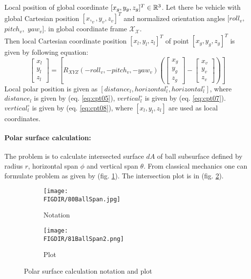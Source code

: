 \begin{definition}{Local position of global coordinate $[x_g,y_g,z_g]^T\in\mathbb{R}^3$.}\label{def:globalToLocal}
    Let there be vehicle with global Cartesian position $[x,_v,y_v,z_v]^T$ and normalized orientation angles $[roll_v,$ $pitch_v,$ $yaw_v]$. in global coordinate frame $\mathscr{X}_\mathscr{X}$.\\
    Then local Cartesian coordinate position $[x_l,y_l,z_l]^T$ of point $[x_g,y_g,z_g]^T$ is given by following equation:
    \begin{equation}
        \begin{bmatrix}
            x_l\\y_l\\z_l
        \end{bmatrix}
        =
        \left [
            R_{XYZ}(-roll_v,-pitch_v,-yaw_v)
            \left (
            \begin{bmatrix}
                x_g\\y_g\\z_g
            \end{bmatrix}
            -
            \begin{bmatrix}
                x_v\\y_v\\z_v
            \end{bmatrix}
            \right )
        \right ]
    \end{equation}
    Local polar position is given as $[distance_l, horizontal_l^\circ,horizontal_l^\circ]$, where $distance_l$ is given by (eq. \ref{eq:cpt05}), $vertical_l^\circ$ is given by (eq. \ref{eq:cpt07}). $vertical_l^\circ$ is given by (eq. \ref{eq:cpt08}), where $[x_l,y_l,z_l]$ are used as local coordinates.
\end{definition}

\paragraph{Polar surface calculation:} The problem is to calculate intersected surface $dA$ of ball subsurface defined by radius $r$, horizontal span $\phi$ and vertical span $\theta$. From classical mechanics one can formulate problem as given by (fig. \ref{fig:80BallSpan}). The intersection plot is in (fig. \ref{fig:81BallSpan2}).

\begin{figure}[H]
    \centering
    \begin{subfigure}[H]{0.3\textwidth}
        \texttt{[image: \\FIGDIR/80BallSpan.jpg]}
        \caption{Notation}
        \label{fig:80BallSpan}
    \end{subfigure}
    \begin{subfigure}[H]{0.3\textwidth}
        \texttt{[image: \\FIGDIR/81BallSpan2.png]}
        \caption{Plot}
        \label{fig:81BallSpan2}
    \end{subfigure}
    \caption{Polar surface calculation notation and plot}
    \label{fig:BallSpanNOTPLOT}
\end{figure}

